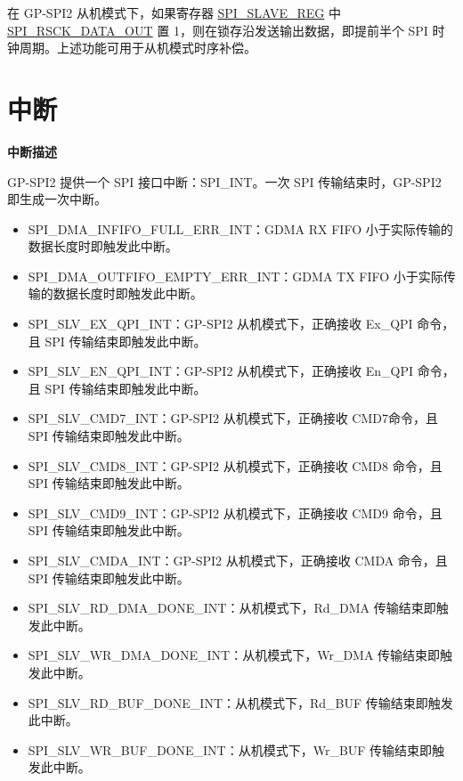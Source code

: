 \documentclass[main\_\_CN.tex]{subfiles}
\begin{document}
在 GP-SPI2 从机模式下，如果寄存器 \hyperref[regdesc:SPISLAVEREG]{SPI\_SLAVE\_REG} 中 \hyperref[fielddesc:SPIRSCKDATAOUT]{SPI\_RSCK\_DATA\_OUT} 置 1，则在锁存沿发送输出数据，即提前半个 SPI 时钟周期。上述功能可用于从机模式时序补偿。


\section{中断} \label{sec:spi-interrupt}

\textbf{中断描述}

GP-SPI2 提供一个 SPI 接口中断：SPI\_INT。一次 SPI 传输结束时，GP-SPI2 即生成一次中断。

\begin{itemize}
\item \label{int:SPIINFIFOFULLERRINT}SPI\_DMA\_INFIFO\_FULL\_ERR\_INT：GDMA RX FIFO 小于实际传输的数据长度时即触发此中断。
\item \label{int:SPIOUTFIFOEMPTYERRINT}SPI\_DMA\_OUTFIFO\_EMPTY\_ERR\_INT：GDMA TX FIFO 小于实际传输的数据长度时即触发此中断。

\item \label{int:SPISLVEXQPIINT} SPI\_SLV\_EX\_QPI\_INT：GP-SPI2 从机模式下，正确接收 Ex\_QPI 命令，且 SPI 传输结束即触发此中断。
\item \label{int:SPISLVENQPIINT} SPI\_SLV\_EN\_QPI\_INT：GP-SPI2 从机模式下，正确接收 En\_QPI 命令，且 SPI 传输结束即触发此中断。
\item \label{int:SPISLVCMD7INT} SPI\_SLV\_CMD7\_INT：GP-SPI2 从机模式下，正确接收 CMD7命令，且 SPI 传输结束即触发此中断。
\item \label{int:SPISLVCMD8INT} SPI\_SLV\_CMD8\_INT：GP-SPI2 从机模式下，正确接收 CMD8 命令，且 SPI 传输结束即触发此中断。
\item \label{int:SPISLVCMD9INT} SPI\_SLV\_CMD9\_INT：GP-SPI2 从机模式下，正确接收 CMD9 命令，且 SPI 传输结束即触发此中断。
\item \label{int:SPISLVCMDAINT} SPI\_SLV\_CMDA\_INT：GP-SPI2 从机模式下，正确接收 CMDA 命令，且 SPI 传输结束即触发此中断。

\item \label{int:SPISLVRDDMADONEINT}SPI\_SLV\_RD\_DMA\_DONE\_INT：从机模式下，Rd\_DMA 传输结束即触发此中断。
\item \label{int:SPISLVWRDMADONEINT}SPI\_SLV\_WR\_DMA\_DONE\_INT：从机模式下，Wr\_DMA 传输结束即触发此中断。
\item \label{int:SPISLVRDBUFDONEINT}SPI\_SLV\_RD\_BUF\_DONE\_INT：从机模式下，Rd\_BUF 传输结束即触发此中断。
\item \label{int:SPISLVWRBUFDONEINT}SPI\_SLV\_WR\_BUF\_DONE\_INT：从机模式下，Wr\_BUF 传输结束即触发此中断。


\end{itemize}
\end{document}

